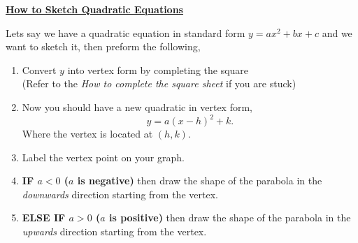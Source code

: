 \documentclass[12pt]{article} %
\begin{document}
	\renewcommand*{\coursecode}{MATH 235} %
	\renewcommand*{\assgnnumber}{Assignment 1} %
	\renewcommand*{\submdate}{September 14, 2021} %
	\renewcommand*{\studentfname}{Abdullah} %
	\renewcommand*{\studentlname}{Zubair} %
    \renewcommand*{\proofname}{Proof:}

	\renewcommand\qedsymbol{$\blacksquare$}
	\setfigpath
	\fancyhfoffset[L,O]{0pt} %




\begin{center}
	\textbf{\underline{\Huge{How to Sketch Quadratic Equations}}}
\end{center}

	\vspace*{0.5cm}
	Lets say we have a quadratic equation in standard form $y = ax^2 + bx + c$ and we want to sketch it, then preform the following,
	\begin{enumerate}
		\item Convert $y$ into vertex form by completing the square \\
			(Refer to the \emph{How to complete the square sheet} if you are stuck)
		\item Now you should have a new quadratic in vertex form,
						\[
						y = a(x-h)^2 + k
						.\] 
						Where the vertex is located at $(h,k)$.
		\item Label the vertex point on your graph.
		\item \textbf{IF $a < 0$ ($a$ is negative)} then draw the shape of the parabola in the \emph{downwards} direction starting
			from the vertex.
		\item \textbf{ELSE IF $a > 0$ ($a$ is positive)} then draw the shape of the parabola in the \emph{upwards} direction starting
			from the vertex.
	\end{enumerate}
\end{document}

